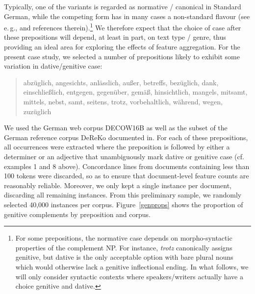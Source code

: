  Typically, one of the variants is regarded as normative / canonical in Standard German, while the competing form has in many cases a non-standard flavour (see e.\,g., \citealp{Dimeola2009} and references therein).\footnote{For some prepositions, the normative case depends on morpho-syntactic properties of the complement NP. For instance, \textit{trotz} canonically assigns genitive, but dative is the only acceptable option with bare plural nouns which would otherwise lack a genitive inflectional ending. In what follows, we will only consider syntactic contexts where speakers/writers actually have a choice genitive and dative.} We therefore expect that the choice of case after these prepositions will depend, at least in part, on text type / genre, thus providing an ideal area for exploring the effects of feature aggregation. For the present case study, we selected a number of prepositions likely to exhibit some variation in dative/genitive case:
 
 \begin{quote} 
   abzüglich, angesichts, anlässlich, au{\ss}er, betreffs, bezüglich, dank, einschlie{\ss}lich, entgegen, gegenüber, gemä{\ss}, hinsichtlich, mangels, mitsamt, mittels, nebst, samt, seitens, trotz, vorbehaltlich, während, wegen, zuzüglich
 \end{quote}


We used the German web corpus DECOW16B \citep{SchaeferBildhauer2012} as well as the subset of the German reference corpus DeReKo \citep{Kupietz-ea2010} documented in\cite{BubenhoferKonopkaSchneider2014}. For each of these prepositions, all occurrences were extracted where the preposition is followed by either a determiner or an adjective that unambiguously mark dative or genitive case (cf. examples 1 and 8 above). Concordance lines from documents containing less than 100 tokens were discarded, so as to ensure that document-level feature counts are reasonably reliable. Moreover, we only kept a single instance per document, discarding all remaining instances. From this preliminary sample, we randomly selected 40,000 instances per corpus. Figure~\ref{genprops} shows the proportion of genitive complements by preposition and corpus.

